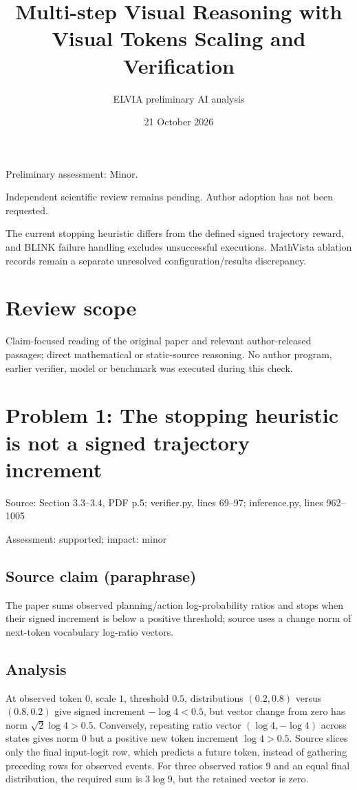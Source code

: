\documentclass[11pt]{article}
\begin{document}
\title{Multi-step Visual Reasoning with Visual Tokens Scaling and Verification}

\author{ELVIA preliminary AI analysis}\date{21 October 2026}\maketitle

Preliminary assessment: Minor.\par

Independent scientific review remains pending. Author adoption has not been requested.

The current stopping heuristic differs from the defined signed trajectory reward, and BLINK failure handling excludes unsuccessful executions. MathVista ablation records remain a separate unresolved configuration/results discrepancy.

\section*{Review scope}

Claim-focused reading of the original paper and relevant author-released passages; direct mathematical or static-source reasoning. No author program, earlier verifier, model or benchmark was executed during this check.

\section*{Problem 1: The stopping heuristic is not a signed trajectory increment}

Source: Section 3.3–3.4, PDF p.5; verifier.py, lines 69–97; inference.py, lines 962–1005

Assessment: supported; impact: minor

\subsection*{Source claim (paraphrase)}

The paper sums observed planning/action log-probability ratios and stops when their signed increment is below a positive threshold; source uses a change norm of next-token vocabulary log-ratio vectors.

\subsection*{Analysis}

At observed token \(0\), scale \(1\), threshold \(0.5\), distributions \((0.2,0.8)\) versus \((0.8,0.2)\) give signed increment \(-\log4<0.5\), but vector change from zero has norm \(\sqrt2\log4>0.5\). Conversely, repeating ratio vector \((\log4,-\log4)\) across states gives norm \(0\) but a positive new token increment \(\log4>0.5\). Source slices only the final input-logit row, which predicts a future token, instead of gathering preceding rows for observed events. For three observed ratios \(9\) and an equal final distribution, the required sum is \(3\log9\), but the retained vector is zero.
\end{document}
